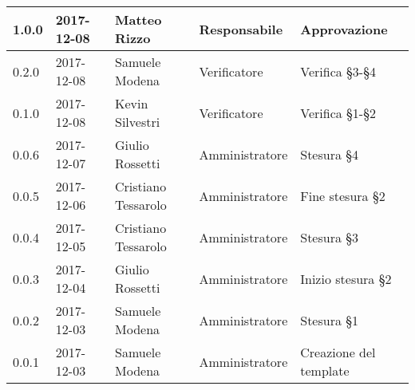 \documentclass[./NormediProgetto.tex]{subfiles}
\begin{document}
\begin{longtable}{|p{20mm}|p{20mm}|p{40mm}|p{30mm}|p{50mm}|}
		\hline
		
		1.0.0 & 2017-12-08 & Matteo Rizzo & Responsabile & Approvazione\\ \hline
		0.2.0 & 2017-12-08 & Samuele Modena & Verificatore & Verifica §3-§4\\ \hline
		0.1.0 & 2017-12-08 & Kevin Silvestri & Verificatore & Verifica §1-§2\\ \hline
		0.0.6 & 2017-12-07 & Giulio Rossetti & Amministratore & Stesura §4\\ \hline
		0.0.5 & 2017-12-06 & Cristiano Tessarolo & Amministratore & Fine stesura §2\\ \hline
		0.0.4 & 2017-12-05 & Cristiano Tessarolo & Amministratore & Stesura §3\\ \hline
		0.0.3 & 2017-12-04 & Giulio Rossetti & Amministratore & Inizio stesura §2\\ \hline
		0.0.2 & 2017-12-03 & Samuele Modena & Amministratore & Stesura §1\\ \hline
		0.0.1 & 2017-12-03 & Samuele Modena & Amministratore & Creazione del template\\ \hline
\end{longtable}
\end{document}
